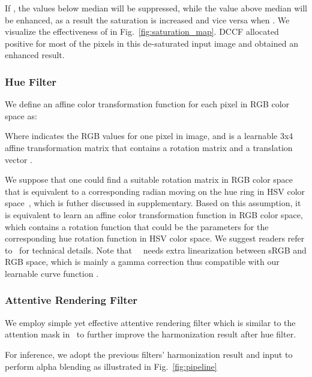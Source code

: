 \documentclass[runningheads]{llncs}
\begin{document}
If , the values below median will be suppressed, while the value above median will be enhanced, as a result the saturation is increased and vice versa when .
    We visualize the effectiveness of  in Fig.~\ref{fig:saturation_map}. 
    DCCF allocated positive  for most of the pixels in this de-saturated input image and obtained an enhanced result.
    


\subsubsection{Hue Filter}


    We define an affine color transformation function  for each pixel in RGB color space as:




    
    
    Where  indicates the RGB values for one pixel in image, and  is a learnable 3x4 affine transformation matrix that contains a rotation matrix  and a translation vector .


    We suppose that one could find a suitable rotation matrix  in RGB color space that is equivalent to a corresponding radian moving  on the hue ring in HSV color space~\cite{haeberli1993matrix}, which is futher discussed in supplementary.
    Based on this assumption, it is equivalent to learn an affine color transformation function  in RGB color space, which contains a rotation function  that could be the parameters for the corresponding hue rotation function  in HSV color space.
    We suggest readers refer to~\cite{haeberli1993matrix} for technical details. Note that~~\cite{haeberli1993matrix} needs extra linearization between sRGB and RGB space, which is mainly a gamma correction thus compatible with our learnable curve function .




\subsubsection{Attentive Rendering Filter} 
    We employ simple yet effective attentive rendering filter  which is similar to the attention mask in~\cite{sofiiuk2021foreground} to further improve the harmonization result after hue filter.




    For inference, we adopt the previous filters' harmonization result  and input  to perform alpha blending as illustrated in Fig.~\ref{fig:pipeline}
    
\end{document}
